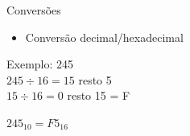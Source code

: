 

\begin{frame}{Conversões}
    \begin{itemize}
        \item Conversão decimal/hexadecimal
    \end{itemize}
    Exemplo: 245 \\[0.2cm]
    \centering
    $245 \div 16 = 15$ resto 5 \\[0.2cm]
    $15 \div 16 = 0$ resto 15 = F \\[0.4cm]
    \vspace{0.2cm}

    $245_{10} = F5_{16}$
\end{frame}